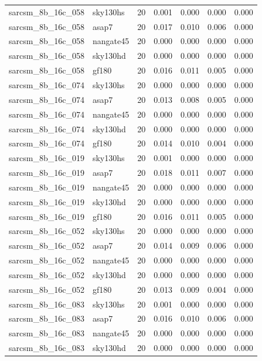\begin{tabular}{llrrrrr}
sarcsm\_8b\_16c\_058 & sky130hs & 20 & 0.001 & 0.000 & 0.000 & 0.000 \\
sarcsm\_8b\_16c\_058 & asap7 & 20 & 0.017 & 0.010 & 0.006 & 0.000 \\
sarcsm\_8b\_16c\_058 & nangate45 & 20 & 0.000 & 0.000 & 0.000 & 0.000 \\
sarcsm\_8b\_16c\_058 & sky130hd & 20 & 0.000 & 0.000 & 0.000 & 0.000 \\
sarcsm\_8b\_16c\_058 & gf180 & 20 & 0.016 & 0.011 & 0.005 & 0.000 \\
sarcsm\_8b\_16c\_074 & sky130hs & 20 & 0.000 & 0.000 & 0.000 & 0.000 \\
sarcsm\_8b\_16c\_074 & asap7 & 20 & 0.013 & 0.008 & 0.005 & 0.000 \\
sarcsm\_8b\_16c\_074 & nangate45 & 20 & 0.000 & 0.000 & 0.000 & 0.000 \\
sarcsm\_8b\_16c\_074 & sky130hd & 20 & 0.000 & 0.000 & 0.000 & 0.000 \\
sarcsm\_8b\_16c\_074 & gf180 & 20 & 0.014 & 0.010 & 0.004 & 0.000 \\
sarcsm\_8b\_16c\_019 & sky130hs & 20 & 0.001 & 0.000 & 0.000 & 0.000 \\
sarcsm\_8b\_16c\_019 & asap7 & 20 & 0.018 & 0.011 & 0.007 & 0.000 \\
sarcsm\_8b\_16c\_019 & nangate45 & 20 & 0.000 & 0.000 & 0.000 & 0.000 \\
sarcsm\_8b\_16c\_019 & sky130hd & 20 & 0.000 & 0.000 & 0.000 & 0.000 \\
sarcsm\_8b\_16c\_019 & gf180 & 20 & 0.016 & 0.011 & 0.005 & 0.000 \\
sarcsm\_8b\_16c\_052 & sky130hs & 20 & 0.000 & 0.000 & 0.000 & 0.000 \\
sarcsm\_8b\_16c\_052 & asap7 & 20 & 0.014 & 0.009 & 0.006 & 0.000 \\
sarcsm\_8b\_16c\_052 & nangate45 & 20 & 0.000 & 0.000 & 0.000 & 0.000 \\
sarcsm\_8b\_16c\_052 & sky130hd & 20 & 0.000 & 0.000 & 0.000 & 0.000 \\
sarcsm\_8b\_16c\_052 & gf180 & 20 & 0.013 & 0.009 & 0.004 & 0.000 \\
sarcsm\_8b\_16c\_083 & sky130hs & 20 & 0.001 & 0.000 & 0.000 & 0.000 \\
sarcsm\_8b\_16c\_083 & asap7 & 20 & 0.016 & 0.010 & 0.006 & 0.000 \\
sarcsm\_8b\_16c\_083 & nangate45 & 20 & 0.000 & 0.000 & 0.000 & 0.000 \\
sarcsm\_8b\_16c\_083 & sky130hd & 20 & 0.000 & 0.000 & 0.000 & 0.000 \\

\end{tabular}

